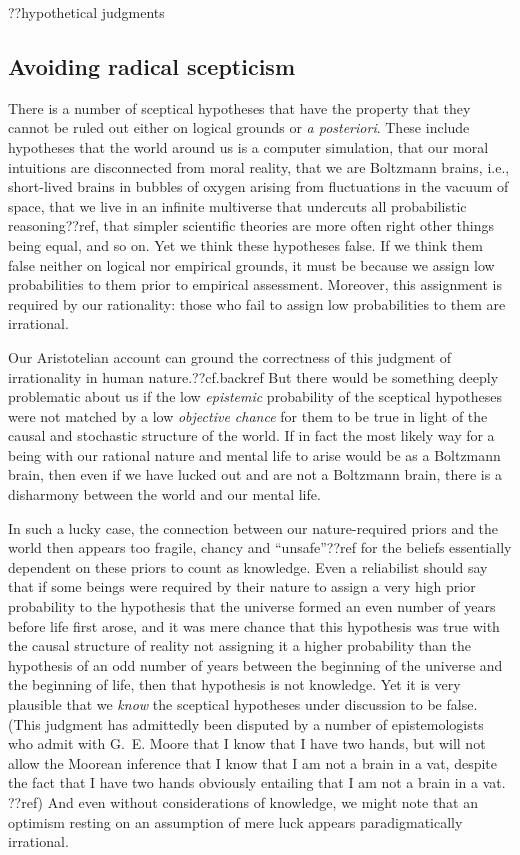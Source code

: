 ??hypothetical judgments



\subsection{Avoiding radical scepticism}
There is a number of sceptical hypotheses that have the property that they cannot be ruled out either on logical grounds
or \textit{a posteriori}. These include hypotheses that the world around us is a computer simulation, that our moral
intuitions are disconnected from moral reality, that we are Boltzmann brains, i.e., short-lived brains in bubbles of 
oxygen arising from fluctuations in the vacuum of space, that we live in an infinite multiverse that undercuts all
probabilistic reasoning??ref, that simpler scientific theories are more often right other things being equal, and so 
on. Yet we think these hypotheses false. If we think them false neither on logical nor empirical grounds, it must be 
because we assign low probabilities to them prior to empirical assessment. Moreover, this assignment is required by 
our rationality: those who fail to assign low probabilities to them are irrational.

Our Aristotelian account can ground the correctness of this judgment of irrationality in human nature.??cf.backref 
But there would be something deeply problematic about us if the low \textit{epistemic} probability of the sceptical hypotheses 
were not matched by a low \textit{objective chance} for them to be true in light of the causal and stochastic structure of the world. 
If in fact the most likely way for a being with our rational nature and mental life to arise would be as a Boltzmann
brain, then even if we have lucked out and are not a Boltzmann brain, there is a disharmony between the world and our
mental life. 

In such a lucky case, the connection between our nature-required priors and the world then appears too fragile, chancy and ``unsafe''??ref
for the beliefs essentially dependent on these priors to count as knowledge. Even a reliabilist should say that if some beings
were required by their nature to assign a very high prior probability to the hypothesis that the universe formed an even number 
of years before life first arose, and it was mere chance that this hypothesis was true with the causal structure of reality
not assigning it a higher probability than the hypothesis of an odd number of years between the beginning of the universe and
the beginning of life, then that hypothesis is not knowledge. Yet it is very plausible that we \textit{know} the sceptical hypotheses
under discussion to be false. (This judgment has admittedly been disputed by a number of epistemologists who admit with G.~E. Moore that
I know that I have two hands, but will not allow the Moorean inference that I know that I am not a brain in a vat, despite the fact that I have two hands
obviously entailing that I am not a brain in a vat. ??ref) And even without considerations of knowledge, we might note that an optimism
resting on an assumption of mere luck appears paradigmatically irrational. 

